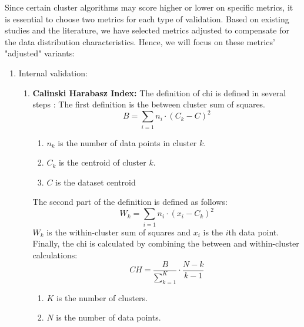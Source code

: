 Since certain cluster algorithms may score higher or lower on specific metrics, it is essential to choose two metrics for each type of validation.
Based on existing studies and the literature, we have selected metrics adjusted to compensate for the data distribution characteristics.
Hence, we will focus on these metrics' "adjusted" variants:
\begin{enumerate}
  \item Internal validation:
        \begin{enumerate}
          \item \textbf{Calinski Harabasz Index:}
                The definition of \gls{chi} is defined in several steps \citep{liu_understanding_2010}:
                The first definition is the between cluster sum of squares.
                \begin{equation}
                  B = \sum_{i=1} n_i \cdot (C_k - C)^2
                \end{equation}
                \begin{enumerate}
                  \item $n_k$ is the number of data points in cluster $k$.
                  \item $C_k$ is the centroid of cluster $k$.
                  \item $C$ is the dataset centroid
                \end{enumerate}
                The second part of the definition is defined as follows:
                \begin{equation}
                  W_k = \sum_{i=1}n_i \cdot (x_i - C_k)^2
                \end{equation}
                $W_k$ is the within-cluster sum of squares and $x_i$ is the $i$th data point.
                Finally, the \gls{chi} is calculated by combining the between and within-cluster calculations:
                \begin{equation}
                  CH = \frac{B}{\sum_{k=1}^{K}} \cdot \frac{N - k}{k - 1}
                \end{equation}
                \begin{enumerate}
                  \item $K$ is the number of clusters.
                  \item $N$ is the number of data points.
                \end{enumerate}


\end{enumerate}
\end{enumerate}
